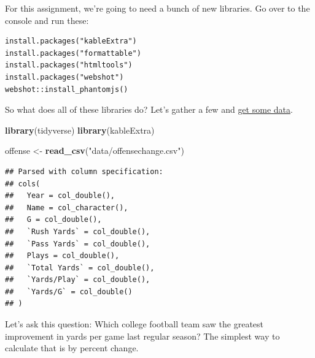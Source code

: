 \documentclass[
]{book}
\newenvironment{Shaded}{\begin{snugshade}}{\end{snugshade}}
\newcommand{\KeywordTok}[1]{\textcolor[rgb]{0.13,0.29,0.53}{\textbf{#1}}}
\newcommand{\NormalTok}[1]{#1}
\newcommand{\StringTok}[1]{\textcolor[rgb]{0.31,0.60,0.02}{#1}}
\begin{document}
For this assignment, we're going to need a bunch of new libraries. Go over to the console and run these:

\begin{verbatim}
install.packages("kableExtra")
install.packages("formattable")
install.packages("htmltools")
install.packages("webshot")
webshot::install_phantomjs()
\end{verbatim}

So what does all of these libraries do? Let's gather a few and \href{https://unl.box.com/s/g3eeuogx8bog72ig28enuakhpdlbn394}{get some data}.

\begin{Shaded}
\begin{Highlighting}[]
\KeywordTok{library}\NormalTok{(tidyverse)}
\KeywordTok{library}\NormalTok{(kableExtra)}
\end{Highlighting}
\end{Shaded}

\begin{Shaded}
\begin{Highlighting}[]
\NormalTok{offense <-}\StringTok{ }\KeywordTok{read_csv}\NormalTok{(}\StringTok{"data/offensechange.csv"}\NormalTok{)}
\end{Highlighting}
\end{Shaded}

\begin{verbatim}
## Parsed with column specification:
## cols(
##   Year = col_double(),
##   Name = col_character(),
##   G = col_double(),
##   `Rush Yards` = col_double(),
##   `Pass Yards` = col_double(),
##   Plays = col_double(),
##   `Total Yards` = col_double(),
##   `Yards/Play` = col_double(),
##   `Yards/G` = col_double()
## )
\end{verbatim}

Let's ask this question: Which college football team saw the greatest improvement in yards per game last regular season? The simplest way to calculate that is by percent change.
\end{document}
